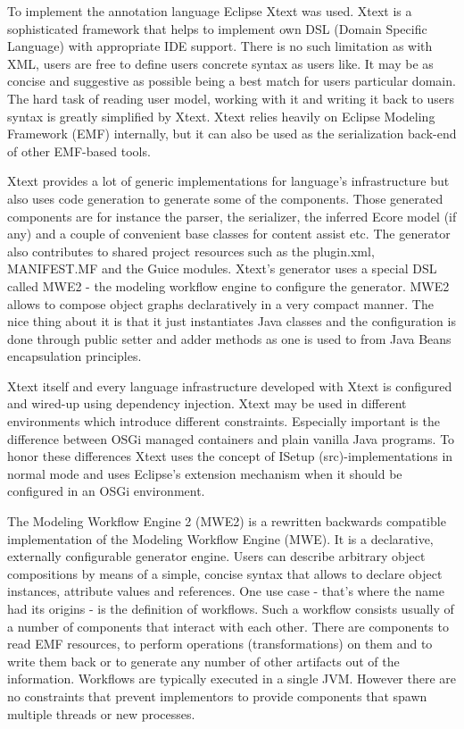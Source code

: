 To implement the annotation language Eclipse Xtext \cite{ref_17_xtext:grammar} was used. Xtext is a sophisticated framework that helps to implement own DSL (Domain Specific Language) with appropriate IDE support. There is no such limitation as with XML, users are free to define users concrete syntax as users like. It may be as concise and suggestive as possible being a best match for users particular domain. The hard task of reading user model, working with it and writing it back to users syntax is greatly simplified by Xtext. Xtext relies heavily on Eclipse Modeling Framework (EMF) internally, but it can also be used as the serialization back-end of other EMF-based tools.  

Xtext provides a lot of generic implementations for language's infrastructure but also uses code generation to generate some of the components. Those generated components are for instance the parser, the serializer, the inferred Ecore model (if any) and a couple of convenient base classes for content assist etc. The generator also contributes to shared project resources such as the plugin.xml, MANIFEST.MF and the Guice modules. Xtext's generator uses a special DSL called MWE2 - the modeling workflow engine to configure the generator. MWE2 allows to compose object graphs declaratively in a very compact manner. The nice thing about it is that it just instantiates Java classes and the configuration is done through public setter and adder methods as one is used to from Java Beans encapsulation principles.

Xtext itself and every language infrastructure developed with Xtext is configured and wired-up using dependency injection. Xtext may be used in different environments which introduce different constraints. Especially important is the difference between OSGi managed containers and plain vanilla Java programs. To honor these differences Xtext uses the concept of ISetup (src)-implementations in normal mode and uses Eclipse's extension mechanism when it should be configured in an OSGi environment.

The Modeling Workflow Engine 2 (MWE2) is a rewritten backwards compatible implementation of the Modeling Workflow Engine (MWE). It is a declarative, externally configurable generator engine. Users can describe arbitrary object compositions by means of a simple, concise syntax that allows to declare object instances, attribute values and references. One use case - that's where the name had its origins - is the definition of workflows. Such a workflow consists usually of a number of components that interact with each other. There are components to read EMF resources, to perform operations (transformations) on them and to write them back or to generate any number of other artifacts out of the information. Workflows are typically executed in a single JVM. However there are no constraints that prevent implementors to provide components that spawn multiple threads or new processes.

